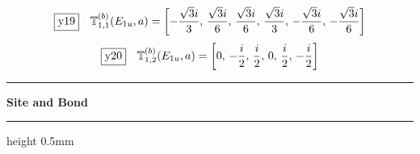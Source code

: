 \documentclass[fleqn,10pt,landscape]{jsarticle}
\begin{document}
\begin{dmath*}
\fbox{y19}\quad \mathbb{T}_{1,1}^{(b)}(E_{1u},a)=\left[ - \frac{\sqrt{3} i}{3},\, \frac{\sqrt{3} i}{6},\, \frac{\sqrt{3} i}{6},\, \frac{\sqrt{3} i}{3},\, - \frac{\sqrt{3} i}{6},\, - \frac{\sqrt{3} i}{6} \right]
\end{dmath*}
\begin{dmath*}
\fbox{y20}\quad \mathbb{T}_{1,2}^{(b)}(E_{1u},a)=\left[ 0,\, - \frac{i}{2},\, \frac{i}{2},\, 0,\, \frac{i}{2},\, - \frac{i}{2} \right]
\end{dmath*}
\vspace{5mm}
\noindent \rule[0.5mm]{5mm}{0.5mm}\hspace{3mm}\textbf{Site and Bond}\hspace{3mm}\leaders\hrule height 0.5mm\hfill\kern0pt
\vspace{3mm}
\end{document}
